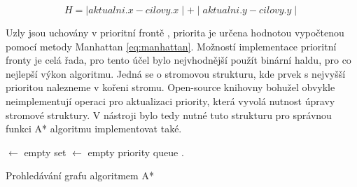 \documentclass[czech,bachelor,public,dept460,male,oneside]{diploma}
\begin{document}
	\begin{equation}
		H = \mid aktualni.x - cilovy.x \mid + \mid aktualni.y - cilovy.y \mid
		\label{eq:manhattan}
	\end{equation}
	
	Uzly jsou uchovány v prioritní frontě \cite{queue}, priorita je určena hodnotou vypočtenou pomocí metody Manhattan \ref{eq:manhattan}. Možností implementace prioritní fronty je celá řada, pro tento účel bylo nejvhodnější použít binární haldu, pro co nejlepší výkon algoritmu. Jedná se o stromovou strukturu, kde prvek s nejvyšší prioritou nalezneme v kořeni stromu. Open-source knihovny bohužel obvykle neimplementují operaci pro aktualizaci priority, která vyvolá nutnost úpravy stromové struktury. V nástroji bylo tedy nutné tuto strukturu pro správnou funkci A* algoritmu implementovat také. 
	
	\begin{algorithm}[!h]
		
		
		
		
		\Closed $\leftarrow$ empty set\;
		\Open $\leftarrow$ empty priority queue\;
		\Open.\;
		\caption{Prohledávání grafu algoritmem A*}
		\label{alg:astar}
	\end{algorithm}
	
\end{document}
